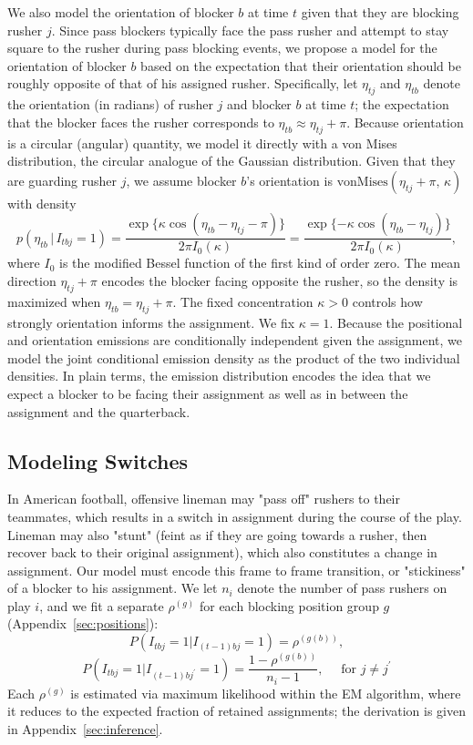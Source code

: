 \documentclass[USenglish]{article}
\let\OldSubsection\subsection
\renewcommand{\subsection}{\FloatBarrier\OldSubsection}
\theoremstyle{dgthm}
\theoremstyle{dgdef}
\begin{document}
 We also model the orientation of blocker $b$ at time $t$ given that they are blocking rusher $j$. Since pass blockers typically face the pass rusher and attempt to stay square to the rusher during pass blocking events, we propose a model for the orientation of blocker $b$ based on the expectation that their orientation should be roughly opposite of that of his assigned rusher. Specifically, let $\eta_{tj}$ and $\eta_{tb}$ denote the orientation (in radians) of rusher $j$ and blocker $b$ at time $t$; the expectation that the blocker faces the rusher corresponds to $\eta_{tb} \approx \eta_{tj} + \pi$. Because orientation is a circular (angular) quantity, we model it directly with a von Mises distribution, the circular analogue of the Gaussian distribution.  Given that they are guarding rusher $j$, we assume blocker $b$'s orientation is $\text{vonMises}(\eta_{tj} + \pi, \, \kappa)$ with density
$$ p(\eta_{tb} \,|\, I_{tbj} = 1) = \frac{\exp\{\kappa \cos(\eta_{tb} - \eta_{tj} - \pi)\}}{2\pi I_0(\kappa)} = \frac{\exp\{-\kappa \cos(\eta_{tb} - \eta_{tj})\}}{2\pi I_0(\kappa)}, $$
where $I_0$ is the modified Bessel function of the first kind of order zero. The mean direction $\eta_{tj} + \pi$ encodes the blocker facing opposite the rusher, so the density is maximized when $\eta_{tb} = \eta_{tj} + \pi$. The fixed concentration $\kappa > 0$ controls how strongly orientation informs the assignment. We fix $\kappa = 1$. Because the positional and orientation emissions are conditionally independent given the assignment, we model the joint conditional emission density as the product of the two individual densities. In plain terms, the emission distribution encodes the idea that we expect a blocker to be facing their assignment as well as in between the assignment and the quarterback. 

\subsection{Modeling Switches}
In American football, offensive lineman may "pass off" rushers to their teammates, which results in a switch in assignment during the course of the play. Lineman may also "stunt" (feint as if they are going towards a rusher, then recover back to their original assignment), which also constitutes a change in assignment. Our model must encode this frame to frame transition, or "stickiness" of a blocker to his assignment.
 We let $n_i$ denote the number of pass rushers on play $i$, and we fit a separate  $\rho^{(g)}$ for each blocking position group $g$ (Appendix~\ref{sec:positions}):
$$ P(I_{tbj} = 1 | I_{(t-1)bj} = 1) = \rho^{(g(b))}, $$
$$ P(I_{tbj} = 1 | I_{(t-1)bj^{'}} = 1) = \frac{1 - \rho^{(g(b))}}{n_i -1},  \quad  \text{ for } j \neq j^{'}$$
Each $\rho^{(g)}$ is estimated via maximum likelihood within the EM algorithm, where it reduces to the expected fraction of retained assignments; the derivation is given in Appendix~\ref{sec:inference}.
\end{document}
